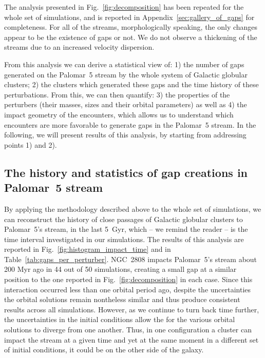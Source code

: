 \documentclass[draft]{aa}
\begin{document}
    The analysis presented in Fig.~\ref{fig:decomposition} has been repeated for the whole set of simulations, and is reported in Appendix~\ref{sec:gallery_of_gaps} for completeness. For all of the streams, morphologically speaking, the only changes appear to be the existence of gaps or not. We do not observe a thickening of the streams due to an increased velocity dispersion. 
    
    From this analysis we can derive a statistical view of: 1) the number of gaps generated on the Palomar~5 stream by the whole system of Galactic globular clusters; 2) the clusters which generated these gaps and the time history of these perturbations. From this, we can then quantify: 3) the properties of the perturbers (their masses, sizes and their orbital parameters) as well as 4) the impact geometry of the encounters, which allows us to understand which encounters are more favorable to generate gaps in the Palomar~5 stream. In the following, we will present results of this analysis, by starting from addressing points 1) and 2).





  \subsection{The history and statistics of gap creations in Palomar~5 stream}\label{sect:history}
  

      


    By applying the methodology described above to the whole set of simulations, we can reconstruct the history of close passages of Galactic globular clusters to Palomar~5's stream, in the last 5~Gyr, which -- we remind the reader -- is the time interval investigated in our simulations. The results of this analysis are reported in Fig.~\ref{fig:histogram_impact_time} and in Table~\ref{tab:gaps_per_perturber}. NGC~2808 impacts Palomar~5's stream about 200 Myr ago in 44 out of 50 simulations, creating a small gap at a similar position to the one reported in Fig.~\ref{fig:decomposition} in each case. Since this interaction occurred less than one orbital period ago, despite the uncertainties the orbital solutions remain nontheless similar and thus produce consistent results across all simulations. However, as we continue to turn back time further, the uncertainties in the initial conditions allow the for the various orbital solutions to diverge from one another. Thus, in one configuration a cluster can impact the stream at a given time and yet at the same moment in a different set of initial conditions, it could be on the other side of the galaxy.
    
\end{document}
